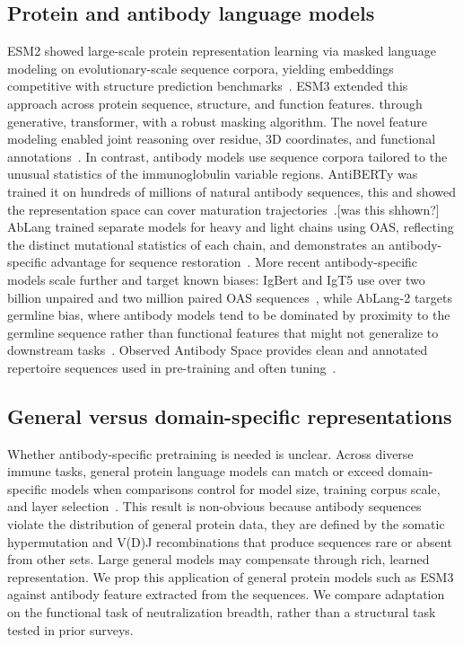 \subsection{Protein and antibody language models}
ESM2 showed large-scale protein representation learning via masked
language modeling on evolutionary-scale sequence corpora, yielding embeddings
competitive with structure prediction benchmarks~\cite{lin2023esm2}. ESM3 extended
this approach across protein sequence, structure, and function features.
through generative, transformer, with a robust masking algorithm.
The novel feature modeling enabled joint reasoning over
residue, 3D coordinates, and functional annotations~\cite{hayes2025esm3}.
In contrast, antibody models use sequence corpora tailored to
the unusual statistics of the immunoglobulin variable regions.
AntiBERTy was trained it on hundreds of millions of natural antibody sequences,
this and showed the representation space can cover maturation
trajectories~\cite{ruffolo2021antiberty}.[was this shhown?]
AbLang trained separate models
for heavy and light chains using OAS, reflecting the distinct mutational
statistics of each chain, and demonstrates an antibody-specific advantage for
sequence restoration~\cite{olsen2022ablang}. More recent antibody-specific
models scale further and target known biases: IgBert and IgT5 use
over two billion unpaired and two million paired OAS
sequences~\cite{kenlay2024igbert}, while AbLang-2 targets
germline bias, where antibody models tend to be
dominated by proximity to the germline sequence rather than functional
features that might not generalize to downstream tasks~\cite{olsen2024ablang2}.
Observed Antibody Space provides clean and annotated repertoire sequences
used in pre-training and often tuning~\cite{olsen2022oas}.

\subsection{General versus domain-specific representations}
Whether antibody-specific pretraining is needed is unclear. Across
diverse immune tasks, general protein language models can match or exceed
domain-specific models when comparisons control for model size, training corpus
scale, and layer selection~\cite{deutschmann2024domain}.
This result is non-obvious because
antibody sequences violate the distribution of general protein data,
they are defined by the somatic hypermutation and V(D)J
recombinations that produce sequences rare or absent from other sets.
Large general models may compensate through rich, learned representation.
We prop this application of general protein models such as ESM3 against
antibody feature extracted from the sequences.
We compare
adaptation on the functional task of neutralization breadth, rather than a structural 
task tested in prior surveys.

